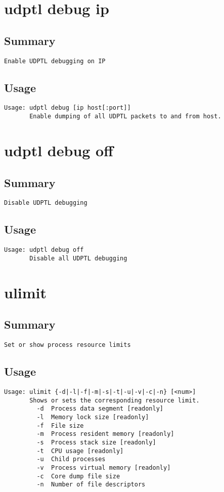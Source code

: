 \section{udptl debug ip}
\subsection{Summary}
\begin{verbatim}
Enable UDPTL debugging on IP
\end{verbatim}
\subsection{Usage}
\begin{verbatim}
Usage: udptl debug [ip host[:port]]
       Enable dumping of all UDPTL packets to and from host.

\end{verbatim}


\section{udptl debug off}
\subsection{Summary}
\begin{verbatim}
Disable UDPTL debugging
\end{verbatim}
\subsection{Usage}
\begin{verbatim}
Usage: udptl debug off
       Disable all UDPTL debugging

\end{verbatim}


\section{ulimit}
\subsection{Summary}
\begin{verbatim}
Set or show process resource limits
\end{verbatim}
\subsection{Usage}
\begin{verbatim}
Usage: ulimit {-d|-l|-f|-m|-s|-t|-u|-v|-c|-n} [<num>]
       Shows or sets the corresponding resource limit.
         -d  Process data segment [readonly]
         -l  Memory lock size [readonly]
         -f  File size
         -m  Process resident memory [readonly]
         -s  Process stack size [readonly]
         -t  CPU usage [readonly]
         -u  Child processes
         -v  Process virtual memory [readonly]
         -c  Core dump file size
         -n  Number of file descriptors

\end{verbatim}


